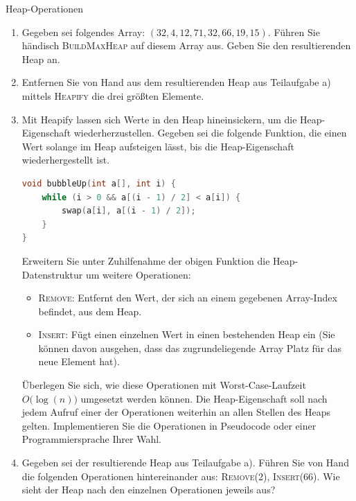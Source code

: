 \documentclass[11pt,a4paper]{article}
\begin{document}
\thispagestyle{empty}





\begin{aufgabe}{1}{Heap-Operationen}
    \begin{enumerate}[label=\alph*)]
        \item \label{it:ex} Gegeben sei folgendes Array: $(32, 4, 12, 71, 32, 66, 19, 15)$. Führen Sie händisch \textsc{BuildMaxHeap} auf diesem Array aus.
        Geben Sie den resultierenden Heap an.
        \item Entfernen Sie von Hand aus dem resultierenden Heap aus Teilaufgabe a) mittels \textsc{Heapify} die drei größten Elemente.
        \item \hard Mit Heapify lassen sich Werte in den Heap hineinsickern, um die Heap-Eigenschaft wiederherzustellen.
        Gegeben sei die folgende Funktion, die einen Wert solange im Heap aufsteigen lässt, bis die Heap-Eigenschaft wiederhergestellt ist.
        \begin{lstlisting}[language=c++]
void bubbleUp(int a[], int i) {
    while (i > 0 && a[(i - 1) / 2] < a[i]) {
        swap(a[i], a[(i - 1) / 2]);
    }
}
        \end{lstlisting}
        Erweitern Sie unter Zuhilfenahme der obigen Funktion die Heap-Datenstruktur um weitere Operationen:
        \begin{itemize}
            \item \textsc{Remove}: Entfernt den Wert, der sich an einem gegebenen Array-Index befindet, aus dem Heap.
            \item \textsc{Insert}: Fügt einen einzelnen Wert in einen bestehenden Heap ein (Sie können davon ausgehen, dass das zugrundeliegende Array Platz für das neue Element hat).
        \end{itemize}
        Überlegen Sie sich, wie diese Operationen mit Worst-Case-Laufzeit $O\big(\log(n)\big)$ umgesetzt werden können.
        Die Heap-Eigenschaft soll nach jedem Aufruf einer der Operationen weiterhin an allen Stellen des Heaps gelten.
        Implementieren Sie die Operationen in Pseudocode oder einer Programmiersprache Ihrer Wahl.
        \item \hard Gegeben sei der resultierende Heap aus Teilaufgabe a).
        Führen Sie von Hand die folgenden Operationen hintereinander aus: \textsc{Remove(2)}, \textsc{Insert(66)}.
        Wie sieht der Heap nach den einzelnen Operationen jeweils aus?
    \end{enumerate}
\end{aufgabe}
\end{document}
